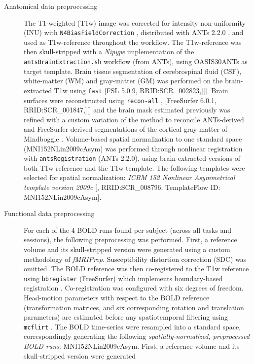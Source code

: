 \documentclass[10pt,letterpaper]{article}
\begin{document}
\begin{description}
\item[Anatomical data preprocessing]
The T1-weighted (T1w) image was corrected for intensity non-uniformity
(INU) with \texttt{N4BiasFieldCorrection} \cite{n4}, distributed with
ANTs 2.2.0 \cite[RRID:SCR\_004757]{ants}, and used as T1w-reference
throughout the workflow.
The T1w-reference was then skull-stripped with a \emph{Nipype} implementation
of the \texttt{antsBrainExtraction.sh} workflow (from ANTs), using OASIS30ANTs
as target template.
Brain tissue segmentation of cerebrospinal fluid (CSF), white-matter (WM) and
gray-matter (GM) was performed on the brain-extracted T1w using
\texttt{fast} \cite{fsl_fast} [FSL 5.0.9, RRID:SCR\_002823,][].
Brain surfaces were reconstructed using \texttt{recon-all} \cite{fs_reconall},
[FreeSurfer 6.0.1, RRID:SCR\_001847,][] and the brain mask estimated
previously was refined with a custom variation of the method to
reconcile ANTs-derived and FreeSurfer-derived segmentations of the
cortical gray-matter of Mindboggle \cite[RRID:SCR\_002438,]{mindboggle}.
Volume-based spatial normalization to one standard space (MNI152NLin2009cAsym)
was performed through nonlinear registration with \texttt{antsRegistration}
(ANTs 2.2.0), using brain-extracted versions of both T1w reference and the T1w template.
The following templates were selected for spatial normalization: \emph{ICBM 152 Nonlinear
Asymmetrical template version 2009c} {[}\cite{mni152nlin2009casym},
RRID:SCR\_008796; TemplateFlow ID: MNI152NLin2009cAsym{]}.
\item[Functional data preprocessing]
For each of the 4 BOLD runs found per subject (across all tasks and
sessions), the following preprocessing was performed. First, a reference
volume and its skull-stripped version were generated using a custom
methodology of \emph{fMRIPrep}.
Susceptibility distortion correction (SDC) was omitted.
The BOLD reference was then co-registered to the T1w reference using \texttt{bbregister}
(FreeSurfer) which implements boundary-based registration \cite{bbr}.
Co-registration was configured with six degrees of freedom.
Head-motion parameters with respect to the BOLD reference (transformation matrices,
and six corresponding rotation and translation parameters) are estimated before any
spatiotemporal filtering using \texttt{mcflirt} \cite[FSL 5.0.9,]{mcflirt}.
The BOLD time-series were resampled into a standard space, correspondingly
generating the following \emph{spatially-normalized, preprocessed BOLD runs}:
MNI152NLin2009cAsym.
First, a reference volume and its skull-stripped version were generated 

\end{description}
\end{document}
